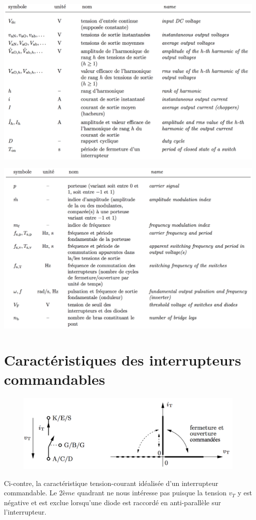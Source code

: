 	\begin{minipage}{0.5\textwidth}
		\includegraphics[scale=0.25]{ch4/2}
	\end{minipage}
	\begin{minipage}{0.5\textwidth}
		\vspace{3mm}
		\includegraphics[scale=0.25]{ch4/3}	
	\end{minipage}
	
\section{Caractéristiques des interrupteurs commandables}
	\begin{figure}
	\vspace{-5mm}
	\includegraphics[scale=0.25]{ch4/4}
	\end{figure}
	Ci-contre, la caractéristique tension-courant idéalisée d'un interrupteur commandable. Le 2${ème}$ quadrant ne nous intéresse pas puisque la tension $v_T$ y est négative et est exclue lorsqu'une diode est raccordé en anti-parallèle sur l'interrupteur. \\
	
